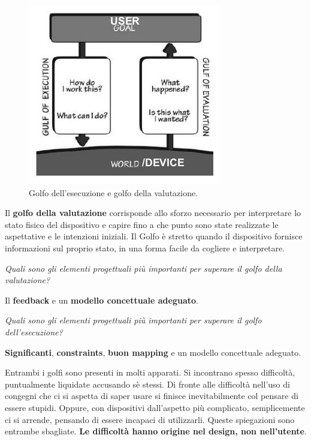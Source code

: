 \documentclass[a4paper,11pt,oneside]{book}
\begin{document}
\begin{figure}[!h]
	\centering
	\includegraphics[scale=0.73]{immagini/Golfi}
	\caption{Golfo dell'esecuzione e golfo della valutazione.}
\end{figure}

Il \textbf{golfo della valutazione} corrisponde allo sforzo necessario per interpretare lo stato fisico del dispositivo e capire fino a che punto sono state realizzate le aspettative e le intenzioni iniziali. Il Golfo è stretto quando il dispositivo fornisce informazioni sul proprio stato, in una forma facile da cogliere e interpretare.

\pagebreak

\begin{flushleft}
	\textit{
		Quali sono gli elementi progettuali più importanti per superare il golfo della valutazione?}
\end{flushleft}

Il \textbf{feedback} e un \textbf{modello concettuale adeguato}.

\begin{flushleft}
	\textit{Quali sono gli elementi progettuali più importanti per superare il golfo dell'esecuzione?}
\end{flushleft}
\textbf{Significanti}, \textbf{constraints}, \textbf{buon mapping} e un modello concettuale adeguato.

Entrambi i golfi sono presenti in molti apparati. Si incontrano spesso difficoltà, puntualmente liquidate accusando sè stessi. Di fronte alle difficoltà nell'uso di congegni che ci si aspetta di saper usare si finisce inevitabilmente col pensare di essere stupidi. Oppure, con dispositivi dall'aspetto più complicato, semplicemente ci si arrende, pensando di essere incapaci di utilizzarli. Queste spiegazioni sono entrambe sbagliate. \textbf{Le difficoltà hanno origine nel design, non nell'utente}.
\end{document}
